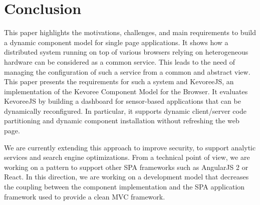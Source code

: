 \section{Conclusion}
This paper highlights the motivations, challenges, and main requirements to build a dynamic component model for single page applications. It shows how a distributed system running on top of various browsers relying on heterogeneous hardware can be considered as a common service. This leads to the need of managing the configuration of such a service from a common and abstract view. This paper presents the requirements for such a system and KevoreeJS, an implementation of the Kevoree Component Model for the Browser. It evaluates KevoreeJS by building a dashboard for sensor-based applications that can be dynamically reconfigured. In particular, it supports dynamic client/server code partitioning and dynamic component installation without refreshing the web page.

We are currently extending this approach to improve security, to support analytic services and search engine optimizations. From a technical point of view, we are working on a pattern to support other SPA frameworks such as AngularJS 2 or React. In this direction, we are working on a development model that decreases the coupling between the  component implementation and the SPA application framework used to provide a clean MVC framework.  %
